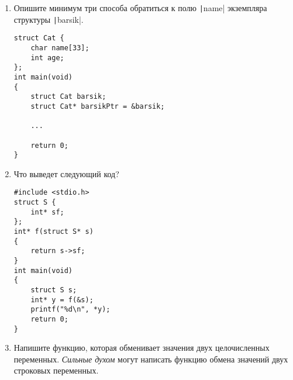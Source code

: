 \documentclass[12pt]{scrartcl}
\begin{document}
\begin{enumerate}
          \noindent\makebox[\linewidth]{\rule{\linewidth}{0.4pt}}

          \noindent\makebox[\linewidth]{\rule{\linewidth}{0.4pt}}

          \noindent\makebox[\linewidth]{\rule{\linewidth}{0.4pt}}
          \newpage
    \item Опишите минимум три способа обратиться к полю \texttt|name| экземпляра структуры \texttt|barsik|. \hrulefill

          \noindent\makebox[\linewidth]{\rule{\linewidth}{0.4pt}}

          \begin{verbatim}
struct Cat {
    char name[33];
    int age;
};
int main(void)
{
    struct Cat barsik;
    struct Cat* barsikPtr = &barsik;

    ...

    return 0;
}
            \end{verbatim}
    \item Что выведет следующий код? \hrulefill
          \begin{verbatim}
#include <stdio.h>
struct S {
    int* sf;
};
int* f(struct S* s)
{
    return s->sf;
}
int main(void)
{
    struct S s;
    int* y = f(&s);
    printf("%d\n", *y);
    return 0;
}
\end{verbatim}
    \item Напишите функцию, которая обменивает значения двух целочисленных переменных. \textit{Сильные духом} могут написать функцию обмена значений двух строковых переменных.
\end{enumerate}
\end{document}
